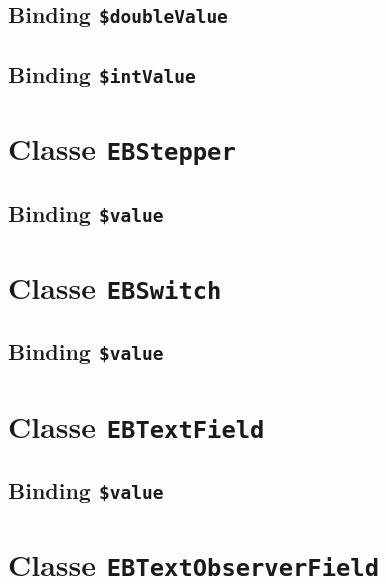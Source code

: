 \subsection{Binding \texttt{\$doubleValue}}

\subsection{Binding \texttt{\$intValue}}








\section{Classe \texttt{EBStepper}}

\subsection{Binding \texttt{\$value}}








\section{Classe \texttt{EBSwitch}}

\subsection{Binding \texttt{\$value}}








\section{Classe \texttt{EBTextField}}

\subsection{Binding \texttt{\$value}}








\section{Classe \texttt{EBTextObserverField}}

